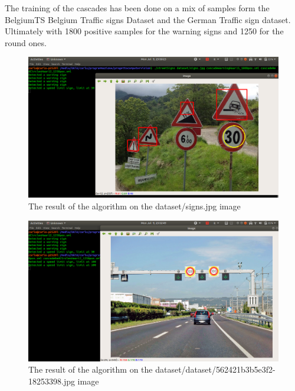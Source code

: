 \documentclass[12pt]{article}
\begin{document}
The training of the cascades has been done on a mix of samples form the BelgiumTS Belgium Traffic signs Dataset and the German 
Traffic sign dataset. Ultimately with 1800 positive samples for the warning signs and 1250 for the round ones.


\begin{figure}[ht!]
	\centering
 	\includegraphics[scale = 0.35]{./Screenshot20180709_235023}
	\caption{ The result of the algorithm on the dataset/signs.jpg image}
\end{figure}
 
 \begin{figure}[ht!]
	\centering
 	\includegraphics[scale = 0.35]{./Screenshot2018-07-0923-52-48}
	\caption{ The result of the algorithm on the dataset/dataset/562421b3b5e3f2-18253398.jpg image}
\end{figure}
\end{document}

